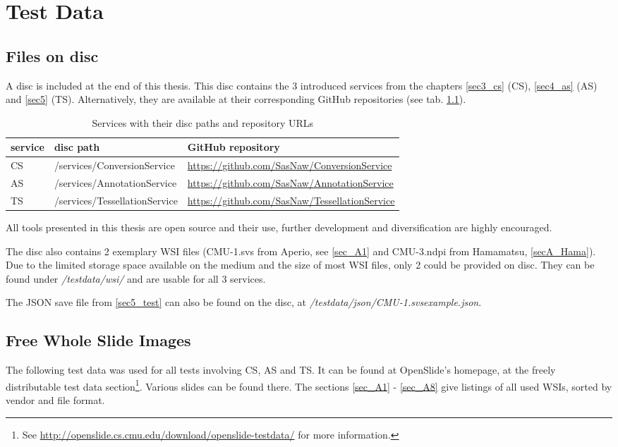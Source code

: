 \chapter{Test Data}

\section{Files on disc}
\label{secA_cd}

A disc is included at the end of this thesis. This disc contains the 3 introduced services from the chapters \ref{sec3_cs} (CS), \ref{sec4_as} (AS) and \ref{sec5} (TS). Alternatively, they are available at their corresponding GitHub repositories (see tab. \ref{tabA_paths}).

\begin{table}[H]
	\begin{center}
		\begin{tabular}{| p{1.5cm} | p{4.5cm} | p{5cm} |}
			\hline
			\textbf{service} & \textbf{disc path} & \textbf{GitHub repository} \\ \hline
			CS & /services/ConversionService & \url{https://github.com/SasNaw/ConversionService} \\ \hline
			AS & /services/AnnotationService & \url{https://github.com/SasNaw/AnnotationService} \\ \hline
			TS & /services/TessellationService & \url{https://github.com/SasNaw/TessellationService}  \\ \hline
		\end{tabular}
		\caption{Services with their disc paths and repository URLs}
		\label{tabA_paths}
	\end{center}
\end{table}

All tools presented in this thesis are open source and their use, further development and diversification are highly encouraged.

The disc also contains 2 exemplary WSI files (CMU-1.svs from Aperio, see \ref{sec_A1} and CMU-3.ndpi from Hamamatsu, \ref{secA_Hama}). Due to the limited storage space available on the medium and the size of most WSI files, only 2 could be provided on disc. They can be found under \emph{/testdata/wsi/} and are usable for all 3 services.

The JSON save file from \ref{sec5_test} can also be found on the disc, at \emph{/testdata/json/CMU-1.svs{\textunderscore}example.json}.



\section{Free Whole Slide Images}
\label{secA}
The following test data was used for all tests involving CS, AS and TS. It can be found at OpenSlide's homepage, at the freely distributable test data section\footnote{
	See \url{http://openslide.cs.cmu.edu/download/openslide-testdata/} for more information.
}. Various slides can be found there. The sections \ref{sec_A1} - \ref{sec_A8} give listings of all used WSIs, sorted by vendor and file format.

